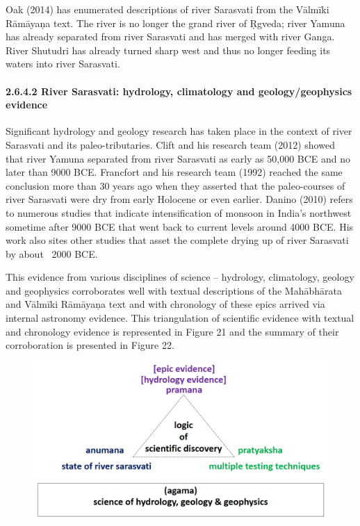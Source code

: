 Oak (2014) has enumerated descriptions of river Sarasvati from the Vālmīki Rāmāyaņa text. The river is no longer the grand river of Ṛgveda; river Yamuna has already separated from river Sarasvati and has merged with river Ganga. River Shutudri has already turned sharp west and thus no longer feeding its waters into river Sarasvati.


\paragraph*{2.6.4.2 River Sarasvati: hydrology, climatology and geology/\break geophysics evidence}

Significant hydrology and geology research has taken place in the context of river Sarasvati and its paleo-tributaries. Clift and his research team (2012) showed that river Yamuna separated from river Sarasvati as early as 50,000 BCE and no later than 9000 BCE. Francfort and his research team (1992) reached the same conclusion more than 30 years ago when they asserted that the paleo-courses of river Sarasvati were dry from early Holocene or even earlier. Danino (2010) refers to numerous studies that indicate intensification of monsoon in India’s northwest sometime after 9000 BCE that went back to current levels around 4000 BCE. His work also sites other studies that asset the complete drying up of river Sarasvati by about ~2000 BCE.

This evidence from various disciplines of science – hydrology, climatology, geology and geophysics corroborates well with textual descriptions of the Mahābhārata and Vālmīki Rāmāyaņa text and with chronology of these epics arrived via internal astronomy evidence. This triangulation of scientific evidence with textual and chronology evidence is represented in Figure 21 and the summary of their corroboration is presented in Figure 22.

\newpage

\begin{figure}[!htbp]
\includegraphics[scale=0.2]{"images/8-21.jpg"}
\caption{}\label{art8-fig21}
\end{figure}


